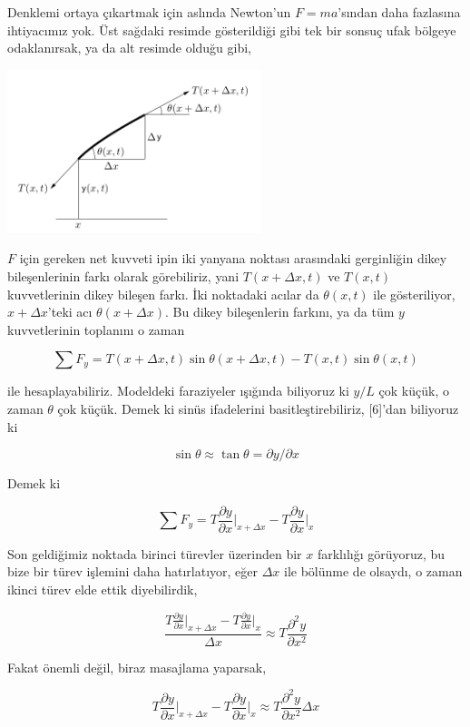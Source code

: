 \documentclass[12pt,fleqn]{article}\usepackage{../../common}
\begin{document}
Denklemi ortaya çıkartmak için aslında Newton'un $F=ma$'sından daha fazlasına
ihtiyacımız yok. Üst sağdaki resimde gösterildiği gibi tek bir sonsuç ufak
bölgeye odaklanırsak, ya da alt resimde olduğu gibi,

\includegraphics[width=20em]{compscieng_app17wave_02.png}

$F$ için gereken net kuvveti ipin iki yanyana noktası arasındaki gerginliğin
dikey bileşenlerinin farkı olarak görebiliriz, yani $T(x+\Delta x,t)$ ve
$T(x,t)$ kuvvetlerinin dikey bileşen farkı. İki noktadaki acılar da
$\theta(x,t)$ ile gösteriliyor, $x+\Delta x$'teki acı $\theta(x+\Delta x)$. Bu
dikey bileşenlerin farkını, ya da tüm $y$ kuvvetlerinin toplanını o zaman 

$$
\sum F_y = T(x+\Delta x,t) \sin\theta(x+\Delta x,t) - T(x,t) \sin\theta(x,t)
$$

ile hesaplayabiliriz. Modeldeki faraziyeler ışığında biliyoruz ki $y/L$ çok
küçük, o zaman $\theta$ çok küçük. Demek ki sinüs ifadelerini
basitleştirebiliriz, [6]'dan biliyoruz ki

$$
\sin\theta \approx \tan\theta = \partial y / \partial x
$$

Demek ki

$$
\sum F_y =
T \frac{\partial y}{\partial x} \bigg\vert_{x+\Delta x} -
T \frac{\partial y}{\partial x} \bigg\vert_{x}
$$

Son geldiğimiz noktada birinci türevler üzerinden bir $x$ farklılığı görüyoruz,
bu bize bir türev işlemini daha hatırlatıyor, eğer $\Delta x$ ile bölünme de
olsaydı, o zaman ikinci türev elde ettik diyebilirdik,

$$
\frac{
T \frac{\partial y}{\partial x} \bigg\vert_{x+\Delta x} -
T \frac{\partial y}{\partial x} \bigg\vert_{x}
}{\Delta x} \approx T \frac{\partial^2 y}{\partial x^2}
$$

Fakat önemli değil, biraz masajlama yaparsak, 

$$
T \frac{\partial y}{\partial x} \bigg\vert_{x+\Delta x} -
T \frac{\partial y}{\partial x} \bigg\vert_{x} \approx
T \frac{\partial^2 y}{\partial x^2} \Delta x 
$$
\end{document}
